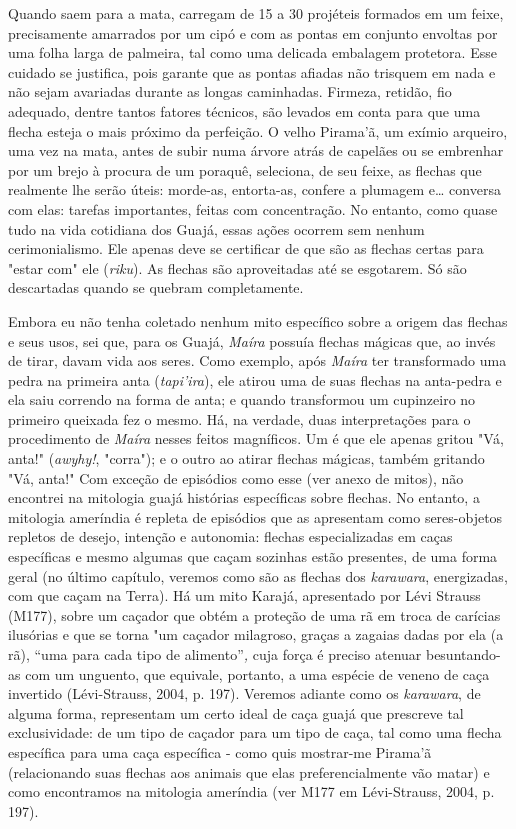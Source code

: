 Quando saem para a mata, carregam de 15 a 30 projéteis formados em um
feixe, precisamente amarrados por um cipó e com as pontas em conjunto
envoltas por uma folha larga de palmeira, tal como uma delicada
embalagem protetora. Esse cuidado se justifica, pois garante que as
pontas afiadas não trisquem em nada e não sejam avariadas durante as
longas caminhadas. Firmeza, retidão, fio adequado, dentre tantos fatores
técnicos, são levados em conta para que uma flecha esteja o mais próximo
da perfeição. O velho Pirama'ã, um exímio arqueiro, uma vez na mata,
antes de subir numa árvore atrás de capelães ou se embrenhar por um
brejo à procura de um poraquê, seleciona, de seu feixe, as flechas que
realmente lhe serão úteis: morde-as, entorta-as, confere a plumagem e\ldots{}
conversa com elas: tarefas importantes, feitas com concentração. No
entanto, como quase tudo na vida cotidiana dos Guajá, essas ações
ocorrem sem nenhum cerimonialismo. Ele apenas deve se certificar de que
são as flechas certas para "estar com" ele (\emph{riku}). As flechas são
aproveitadas até se esgotarem. Só são descartadas quando se quebram
completamente.

Embora eu não tenha coletado nenhum mito específico sobre a origem das
flechas e seus usos, sei que, para os Guajá, \emph{Maíra} possuía
flechas mágicas que, ao invés de tirar, davam vida aos seres. Como
exemplo, após \emph{Maíra} ter transformado uma pedra na primeira anta
(\emph{tapi'ira}), ele atirou uma de suas flechas na anta-pedra e ela
saiu correndo na forma de anta; e quando transformou um cupinzeiro no
primeiro queixada fez o mesmo. Há, na verdade, duas interpretações para
o procedimento de \emph{Maíra} nesses feitos magníficos. Um é que ele
apenas gritou "Vá, anta!" (\emph{awyhy!}, "corra"); e o outro ao atirar
flechas mágicas, também gritando "Vá, anta!" Com exceção de episódios
como esse (ver anexo de mitos), não encontrei na mitologia guajá
histórias específicas sobre flechas. No entanto, a mitologia ameríndia é
repleta de episódios que as apresentam como seres-objetos repletos de
desejo, intenção e autonomia: flechas especializadas em caças
específicas e mesmo algumas que caçam sozinhas estão presentes, de uma
forma geral (no último capítulo, veremos como são as flechas dos
\emph{karawara}, energizadas, com que caçam na Terra). Há um mito
Karajá, apresentado por Lévi Strauss (M177), sobre um caçador que obtém
a proteção de uma rã em troca de carícias ilusórias e que se torna "um
caçador milagroso, graças a zagaias dadas por ela (a rã), ``uma para
cada tipo de alimento''\emph{,} cuja força é preciso atenuar
besuntando-as com um unguento, que equivale, portanto, a uma espécie de
veneno de caça invertido (Lévi-Strauss, 2004, p. 197). Veremos adiante
como os \emph{karawara}, de alguma forma, representam um certo ideal de
caça guajá que prescreve tal exclusividade: de um tipo de caçador para
um tipo de caça, tal como uma flecha específica para uma caça específica
- como quis mostrar-me Pirama'ã (relacionando suas flechas aos animais
que elas preferencialmente vão matar) e como encontramos na mitologia
ameríndia (ver M177 em Lévi-Strauss, 2004, p. 197).

